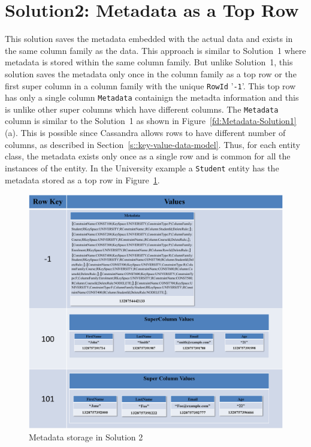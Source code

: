 \section{Solution2:  Metadata as a Top Row} \label{s:design-sol2}


This solution saves the metadata embedded with the actual data and exists in the
same column family as the data. This approach is similar to Solution~1 where
metadata is stored within the same column family. But unlike Solution~1, this
solution saves the metadata only once in the column family as a top row or the
first super column in a column family with the unique \texttt{RowId}
'\texttt{-1}'. This top row has only a single column \texttt{Metadata} 
containign the metadta information and this is  unlike other super columns which
have different columns. The \texttt{Metadata} column is similar to the
Solution~1 as shown in Figure~\ref{fd:Metadata-Solution1} (a). This is possible
since Cassandra allows rows to have different number of columns, as described in Section~\ref{s::key-value-data-model}. Thus, for each entity class, the metadata
exists only once as a single row and is common for all the instances of the
entity.
In the University example  a \texttt{Student} entity has the metadata  stored as
a top row in Figure~\ref{fd:Metadata-Solution2}.
		 
	\begin{figure}[h]  
		\centering 
		\includegraphics[width=.8\textwidth]{./figure/Solutions/Sol2-MD-ColumnFamily.png}
		\caption{Metadata storage in Solution 2}\label{fd:Metadata-Solution2}
	\end{figure}
		

